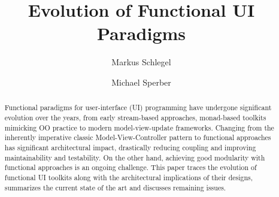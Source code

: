 \documentclass[sigplan,screen]{acmart}
\begin{document}
\title{Evolution of Functional UI Paradigms}

\author{Markus Schlegel}

\author{Michael Sperber}

\begin{abstract}
  Functional paradigms for user-interface (UI) programming have
  undergone significant evolution over the years, from early
  stream-based approaches, monad-based toolkits mimicking OO practice
  to modern model-view-update frameworks.  Changing from the
  inherently imperative classic Model-View-Controller pattern to
  functional approaches has significant architectural impact,
  drastically reducing coupling and improving maintainability and
  testability.  On the other hand, achieving good modularity with
  functional approaches is an ongoing challenge.  This paper traces
  the evolution of functional UI toolkits along with the architectural
  implications of their designs, summarizes the current state of the
  art and discusses remaining issues.
\end{abstract}
\end{document}
